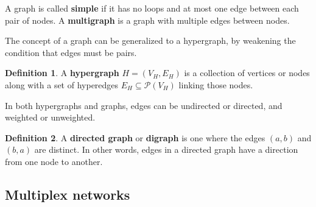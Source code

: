 \documentclass{report}
\theoremstyle{definition}
\newtheorem{defin}{Definition}
\theoremstyle{remark}
\begin{document}
A graph is called \textbf{simple} if it has no loops and at most one edge between each pair of nodes. A \textbf{multigraph} is a graph with multiple edges between nodes. 

The concept of a graph can be generalized to a hypergraph, by weakening the condition that edges must be pairs.
\begin{defin}
        A \textbf{hypergraph} $H = (V_H,E_H)$ is a collection of vertices or nodes along with a set of hyperedges $E_H \subseteq \mathcal{P}(V_H)$ linking those nodes.

\end{defin}
In both hypergraphs and graphs, edges can be undirected or directed, and weighted or unweighted.

\begin{defin}
        A \textbf{directed graph} or \textbf{digraph} is one where the edges $(a,b)$ and $(b,a)$ are distinct. In other words, edges in a directed graph have a direction from one node to another.
\end{defin}



\subsection{Multiplex networks}
\end{document}
